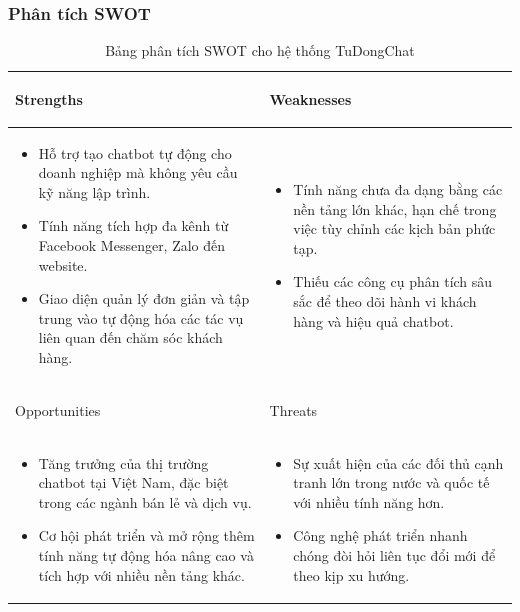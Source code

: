 \subsubsection{Phân tích SWOT}
\begin{table}[H]
\centering
\begin{tabular}{|p{7cm}|p{7cm}|}
\hline
\begin{center}
    Strengths
\end{center}
  &  \begin{center}
      Weaknesses
  \end{center} \\
\hline
\begin{itemize}
    \item Hỗ trợ tạo chatbot tự động cho doanh nghiệp mà không yêu cầu kỹ năng lập trình.
\item Tính năng tích hợp đa kênh từ Facebook Messenger, Zalo đến website.
\item Giao diện quản lý đơn giản và tập trung vào tự động hóa các tác vụ liên quan đến chăm sóc khách hàng.

\end{itemize} &  
\begin{itemize}
    \item Tính năng chưa đa dạng bằng các nền tảng lớn khác, hạn chế trong việc tùy chỉnh các kịch bản phức tạp.
\item Thiếu các công cụ phân tích sâu sắc để theo dõi hành vi khách hàng và hiệu quả chatbot.
\end{itemize}\\
\hline
\begin{center}
    Opportunities
\end{center} & \begin{center}
    Threats
\end{center}\\
\hline
\begin{itemize}
    \item Tăng trưởng của thị trường chatbot tại Việt Nam, đặc biệt trong các ngành bán lẻ và dịch vụ.
\item Cơ hội phát triển và mở rộng thêm tính năng tự động hóa nâng cao và tích hợp với nhiều nền tảng khác.
\end{itemize} &  
\begin{itemize}
    \item Sự xuất hiện của các đối thủ cạnh tranh lớn trong nước và quốc tế với nhiều tính năng hơn.
\item Công nghệ phát triển nhanh chóng đòi hỏi liên tục đổi mới để theo kịp xu hướng.
\end{itemize}\\
\hline
\end{tabular}
\caption{Bảng phân tích SWOT cho hệ thống TuDongChat}
\end{table}
